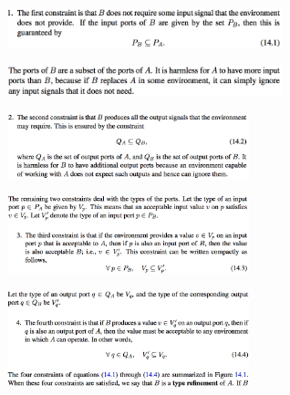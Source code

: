 \documentclass[10pt,landscape]{article}
\begin{document}
\begin{multicols}{3}
\begin{center}
\includegraphics*[width = 8cm]{Fig20.png}\\
\end{center}

\begin{center}
\includegraphics*[width = 8cm]{Fig21.png}\\
\end{center}

\begin{center}
\includegraphics*[width = 7cm]{Fig22.png}\\
\end{center}

\begin{center}
\includegraphics*[width = 7cm]{Fig23.png}\\
\end{center}

\begin{center}
\includegraphics*[width = 7cm]{Fig24.png}\\
\end{center}


\end{multicols}
\end{document}
